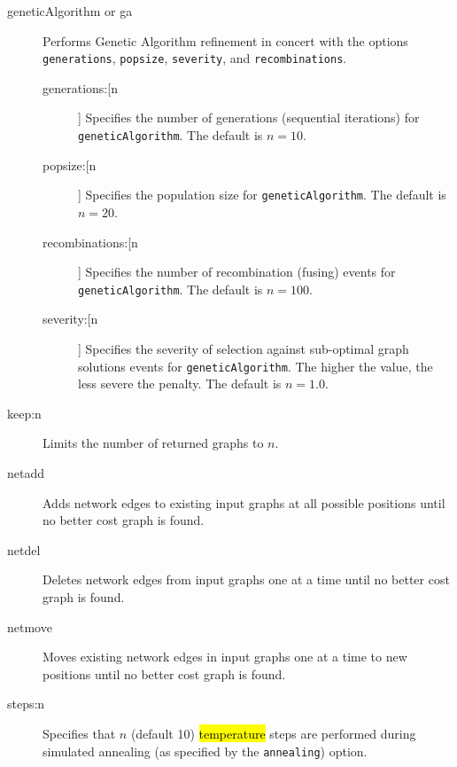 \begin{description}
					
		\item[geneticAlgorithm or ga] Performs Genetic Algorithm \citep{Holland1975} refinement in 
		concert with the options \texttt{generations}, \texttt{popsize}, \texttt{severity}, and 
		\texttt{recombinations}. 
			
			\begin{description}
		
			\item[generations:[n]] Specifies the number of generations (sequential iterations) for 
			\texttt{geneticAlgorithm}. The default is $n=10$.

			\item[popsize:[n]] Specifies the population size for \texttt{geneticAlgorithm}. The default is 
			$n=20$.
			
			\item[recombinations:[n]] Specifies the number of recombination (fusing) events for 
			\texttt{geneticAlgorithm}. The default is $n=100$.
			
			\item[severity:[n]] Specifies the severity of selection against sub-optimal graph solutions 
			events for \texttt{geneticAlgorithm}. The higher the value, the less severe the penalty. The 
			default is $n=1.0$.

			\end{description}
		
		\item[keep:n] Limits the number of returned graphs to $n$. 
		
		\item[netadd] Adds network edges to existing input graphs at all possible positions until no 
		better cost graph is found.
			
		\item[netdel] Deletes network edges from input graphs one at a time until no better cost 
		graph is found.
			
		\item[netmove] Moves existing network edges in input graphs one at a time to new positions 
		until no better cost graph 
		is found.
			
		\item[steps:n] Specifies that $n$ (default 10) \hl{temperature} steps are performed during simulated 
		annealing (as specified by the \texttt{annealing}) option.
		\end{description}
	
